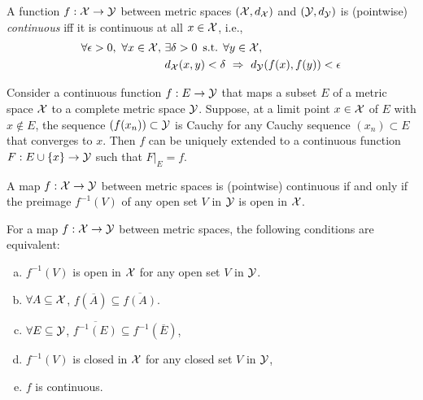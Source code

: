 \begin{defn}
  \label{def:continuousFuncMetricSpace}
  A function $f: {\cal X} \rightarrow {\cal Y}$
  between metric spaces $({\cal X},d_{\cal X})$
  and $({\cal Y}, d_{\cal Y})$
  is (pointwise) \emph{continuous}
  iff it is continuous at all $x\in{\cal X}$,
  i.e., 
  \begin{align}
    \label{eq:continuousFuncMetricSpace}
    \forall \epsilon>0,\ \forall x\in {\cal X},\ 
    & \exists \delta>0\, \text{ s.t. }
    \forall y \in {\cal X},\ \
    \\ \nonumber
    &d_{\cal X}(x,y)<\delta\ \Rightarrow\ d_{\cal Y}(f(x),f(y))<\epsilon
  \end{align}
\end{defn}

\begin{thm}
  \label{thm:continuousExtPoint}
  Consider a continuous function $f: E \rightarrow {\cal Y}$ 
  that maps a subset $E$ of a metric space ${\cal X}$
  to a complete metric space ${\cal Y}$.
  Suppose, at a limit point $x\in {\cal X}$ of $E$ with $x\not\in E$, 
  the sequence $(f(x_n))\subset {\cal Y}$ is Cauchy
  for any Cauchy sequence $(x_n)\subset E$ that converges to $x$. 
  Then $f$ can be uniquely extended to a continuous function
  $F: E\cup\{x\}\rightarrow {\cal Y}$ such that
  $F|_{E} = f$.
\end{thm}

\begin{thm}
  \label{thm:contMapOpenPreimage}
  A map $f:{\cal X}\rightarrow {\cal Y}$ between metric spaces
  is (pointwise) continuous if and only if
  the preimage $f^{-1}(V)$ of any open set $V$ in ${\cal Y}$
  is open in ${\cal X}$.
\end{thm}

\begin{thm}
  \label{thm:contMapConditions}
  For a map $f:{\cal X}\rightarrow {\cal Y}$ between metric spaces,
  the following conditions are equivalent:
  \begin{enumerate}[(a)]\itemsep0em
  \item $f^{-1}(V)$ is open in ${\cal X}$ for any open set $V$ in ${\cal Y}$.
  \item $\forall A\subseteq {\cal X}$,
    $f(\overline{A})\subseteq \overline{f(A)}$.
  \item $\forall E\subseteq {\cal Y}$,
    $\overline{f^{-1}(E)}\subseteq f^{-1}(\overline{E})$, 
  \item $f^{-1}(V)$ is closed in ${\cal X}$
    for any closed set $V$ in ${\cal Y}$,
  \item $f$ is continuous. 
  \end{enumerate}
\end{thm}

